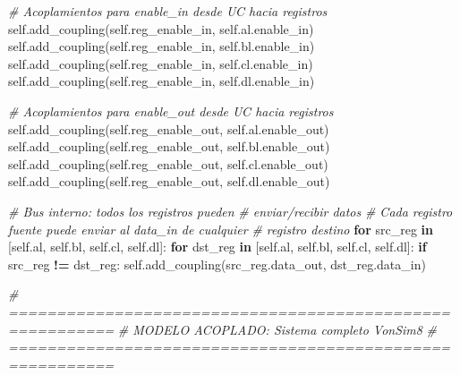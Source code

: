 \documentclass[12pt,oneside]{templates/unerthesis}
\newenvironment{Shaded}{\begin{snugshade}}{\end{snugshade}}
\newcommand{\CommentTok}[1]{\textcolor[rgb]{0.56,0.35,0.01}{\textit{#1}}}
\newcommand{\ControlFlowTok}[1]{\textcolor[rgb]{0.13,0.29,0.53}{\textbf{#1}}}
\newcommand{\KeywordTok}[1]{\textcolor[rgb]{0.13,0.29,0.53}{\textbf{#1}}}
\newcommand{\NormalTok}[1]{#1}
\newcommand{\OperatorTok}[1]{\textcolor[rgb]{0.81,0.36,0.00}{\textbf{#1}}}
\newcommand{\VariableTok}[1]{\textcolor[rgb]{0.00,0.00,0.00}{#1}}
\begin{document}
\begin{Shaded}
\begin{Highlighting}[]
        \CommentTok{\# Acoplamientos para enable\_in desde UC hacia registros}
        \VariableTok{self}\NormalTok{.add\_coupling(}\VariableTok{self}\NormalTok{.reg\_enable\_in, }\VariableTok{self}\NormalTok{.al.enable\_in)}
        \VariableTok{self}\NormalTok{.add\_coupling(}\VariableTok{self}\NormalTok{.reg\_enable\_in, }\VariableTok{self}\NormalTok{.bl.enable\_in)}
        \VariableTok{self}\NormalTok{.add\_coupling(}\VariableTok{self}\NormalTok{.reg\_enable\_in, }\VariableTok{self}\NormalTok{.cl.enable\_in)}
        \VariableTok{self}\NormalTok{.add\_coupling(}\VariableTok{self}\NormalTok{.reg\_enable\_in, }\VariableTok{self}\NormalTok{.dl.enable\_in)}
        
        \CommentTok{\# Acoplamientos para enable\_out desde UC hacia registros}
        \VariableTok{self}\NormalTok{.add\_coupling(}\VariableTok{self}\NormalTok{.reg\_enable\_out, }\VariableTok{self}\NormalTok{.al.enable\_out)}
        \VariableTok{self}\NormalTok{.add\_coupling(}\VariableTok{self}\NormalTok{.reg\_enable\_out, }\VariableTok{self}\NormalTok{.bl.enable\_out)}
        \VariableTok{self}\NormalTok{.add\_coupling(}\VariableTok{self}\NormalTok{.reg\_enable\_out, }\VariableTok{self}\NormalTok{.cl.enable\_out)}
        \VariableTok{self}\NormalTok{.add\_coupling(}\VariableTok{self}\NormalTok{.reg\_enable\_out, }\VariableTok{self}\NormalTok{.dl.enable\_out)}
        
        \CommentTok{\# Bus interno: todos los registros pueden }
        \CommentTok{\# enviar/recibir datos}
        \CommentTok{\# Cada registro fuente puede enviar al data\_in de cualquier}
        \CommentTok{\# registro destino}
        \ControlFlowTok{for}\NormalTok{ src\_reg }\KeywordTok{in}\NormalTok{ [}\VariableTok{self}\NormalTok{.al, }\VariableTok{self}\NormalTok{.bl, }\VariableTok{self}\NormalTok{.cl, }\VariableTok{self}\NormalTok{.dl]:}
            \ControlFlowTok{for}\NormalTok{ dst\_reg }\KeywordTok{in}\NormalTok{ [}\VariableTok{self}\NormalTok{.al, }\VariableTok{self}\NormalTok{.bl, }\VariableTok{self}\NormalTok{.cl, }\VariableTok{self}\NormalTok{.dl]:}
                \ControlFlowTok{if}\NormalTok{ src\_reg }\OperatorTok{!=}\NormalTok{ dst\_reg:}
                    \VariableTok{self}\NormalTok{.add\_coupling(src\_reg.data\_out, }
\NormalTok{                    dst\_reg.data\_in)}


\CommentTok{\# =========================================================}
\CommentTok{\# MODELO ACOPLADO: Sistema completo VonSim8}
\CommentTok{\# =========================================================}


\end{Highlighting}
\end{Shaded}
\end{document}

